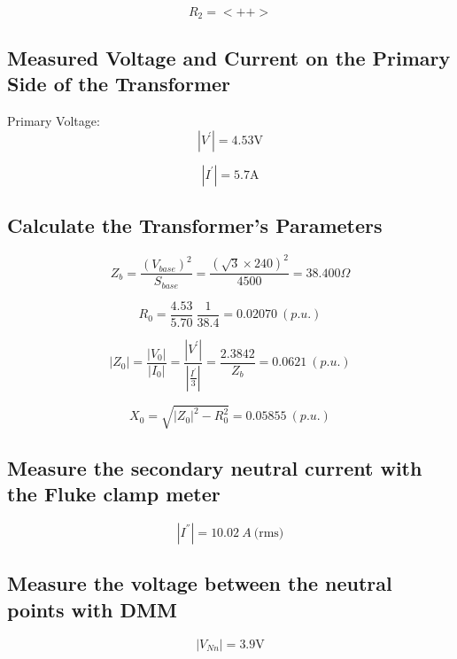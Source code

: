 \documentclass{article}
\begin{document}
\begin{equation}
  R_2 = <++>
\end{equation}

\subsection{Measured Voltage and Current on the Primary Side of the Transformer}

Primary Voltage:
\begin{equation}
  | V^{'} | = 4.53 \text{V}
\end{equation} 

\begin{equation}
  | I^{'} | = 5.7 \text{A}
\end{equation} 

\subsection{Calculate the Transformer's Parameters} 

\begin{equation}
  Z_b = \frac{ \left( V_{base} \right)^2  }{S_{base}} = \frac{\left( \sqrt{3} \times 240 \right)^2}{4500} = 38.400 \Omega
\end{equation}

\begin{equation}
  R_0 = \frac{4.53}{5.70} \ \frac{1}{38.4} = 0.02070 \ (p.u.)
\end{equation}

\begin{equation}
  |Z_0 | = \frac{| V_0 |}{| I_0 |} = \frac{| V^{'} |}{| \frac{I^{'}}{3} |} = \frac{2.3842}{Z_b} = 0.0621 \ (p.u.)
\end{equation}

\begin{equation}
  X_{0} = \sqrt{| Z_0 |^{2} - R^2_0} = 0.05855  \ (p.u.)
\end{equation}

\subsection{Measure the secondary neutral current with the Fluke clamp meter} 

\begin{equation}
  | I^{''} | = 10.02 \ A \ \text{(rms)}
\end{equation}

\subsection{Measure the voltage between the neutral points with DMM} 
\begin{equation}
  | V_{Nn} | = 3.9 \text{V}
\end{equation}
\end{document}
